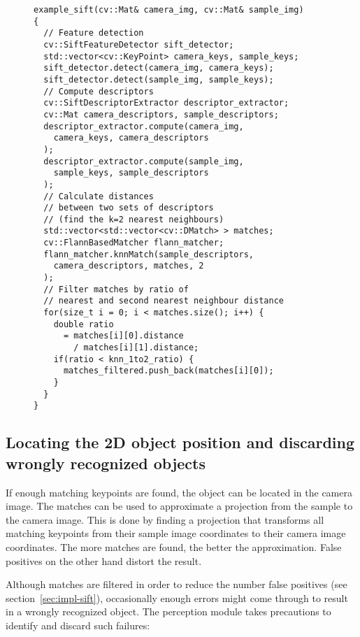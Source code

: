 \begin{figure}[H]
  \begin{lstlisting}[caption=Example of calculating matching points between two images with the OpenCV SIFT implementation.]
example_sift(cv::Mat& camera_img, cv::Mat& sample_img)
{
  // Feature detection
  cv::SiftFeatureDetector sift_detector;
  std::vector<cv::KeyPoint> camera_keys, sample_keys;
  sift_detector.detect(camera_img, camera_keys);
  sift_detector.detect(sample_img, sample_keys);
  // Compute descriptors
  cv::SiftDescriptorExtractor descriptor_extractor;
  cv::Mat camera_descriptors, sample_descriptors;
  descriptor_extractor.compute(camera_img,
    camera_keys, camera_descriptors
  );
  descriptor_extractor.compute(sample_img,
    sample_keys, sample_descriptors
  );
  // Calculate distances
  // between two sets of descriptors
  // (find the k=2 nearest neighbours)
  std::vector<std::vector<cv::DMatch> > matches;
  cv::FlannBasedMatcher flann_matcher;
  flann_matcher.knnMatch(sample_descriptors,
    camera_descriptors, matches, 2
  );
  // Filter matches by ratio of
  // nearest and second nearest neighbour distance
  for(size_t i = 0; i < matches.size(); i++) {
    double ratio
      = matches[i][0].distance
        / matches[i][1].distance;
    if(ratio < knn_1to2_ratio) {
      matches_filtered.push_back(matches[i][0]);
    }
  }
}
  \end{lstlisting}
\end{figure}

\subsection{Locating the 2D object position and discarding wrongly recognized objects}
\label{sec:impl-2Dpose}
If enough matching keypoints are found, the object can be located in the camera image. The matches can be used to approximate a projection from the sample to the camera image. This is done by finding a projection that transforms all matching keypoints from their sample image coordinates to their camera image coordinates. The more matches are found, the better the approximation. False positives on the other hand distort the result.

Although matches are filtered in order to reduce the number false positives (see section~\ref{sec:impl-sift}), occasionally enough errors might come through to result in a wrongly recognized object. The perception module takes precautions to identify and discard such failures: \\

